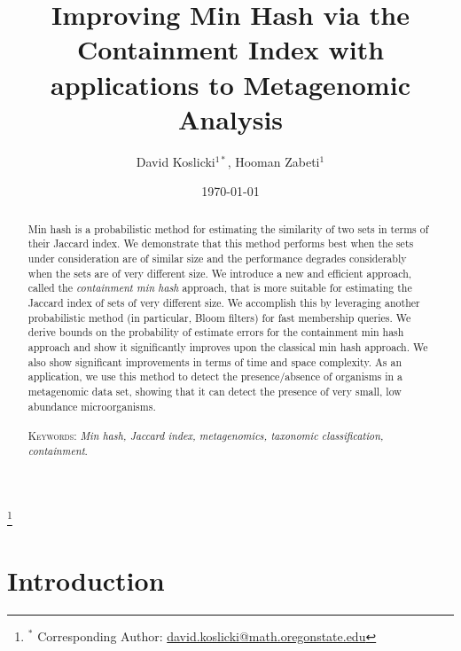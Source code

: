 \documentclass[11pt,reqno]{amsart}
\theoremstyle{remark}
\numberwithin{equation}{section}
\begin{document}
\title[Improving Min Hash]{Improving Min Hash via the Containment Index with applications to Metagenomic Analysis} %


\author{David Koslicki${}^{1*}$, Hooman Zabeti${}^{1}$}
\address{${}^1$ Mathematics Department, Oregon State University, Corvallis, OR.}
\thanks{${}^*$ Corresponding Author: \url{david.koslicki@math.oregonstate.edu}}





\date{\today}
\begin{abstract}
Min hash is a probabilistic method for estimating the similarity of two sets in terms of their Jaccard index. We demonstrate that this method performs best when the sets under consideration are of similar size and the performance degrades considerably when the sets are of very different size. We introduce a new and efficient approach, called the \textit{containment min hash} approach, that is more suitable for estimating the Jaccard index of sets of very different size. We accomplish this by leveraging another probabilistic method (in particular, Bloom filters) for fast membership queries. We derive bounds on the probability of estimate errors for the containment min hash approach and show it significantly improves upon the classical min hash approach. We also show significant improvements in terms of time and space complexity. As an application, we use this method to detect the presence/absence of organisms in a metagenomic data set, showing that it can detect the presence of very small, low abundance microorganisms.  \\\\
\smallskip
\noindent \textsc{Keywords}: \emph{Min hash, Jaccard index, metagenomics, taxonomic classification, containment}.
\end{abstract}
\maketitle


\section{Introduction}
\end{document}
